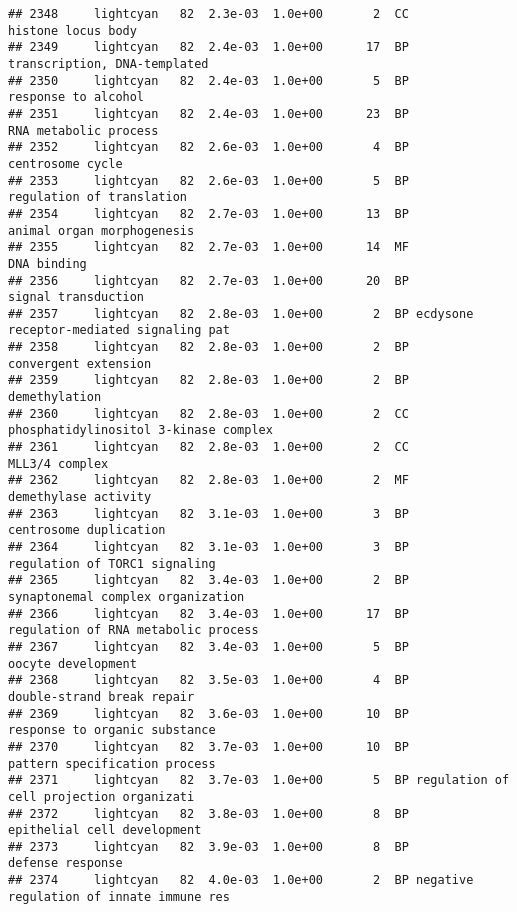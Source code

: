 \documentclass[]{article}
\begin{document}
\begin{verbatim}
## 2348     lightcyan   82  2.3e-03  1.0e+00       2  CC                       histone locus body
## 2349     lightcyan   82  2.4e-03  1.0e+00      17  BP             transcription, DNA-templated
## 2350     lightcyan   82  2.4e-03  1.0e+00       5  BP                      response to alcohol
## 2351     lightcyan   82  2.4e-03  1.0e+00      23  BP                    RNA metabolic process
## 2352     lightcyan   82  2.6e-03  1.0e+00       4  BP                         centrosome cycle
## 2353     lightcyan   82  2.6e-03  1.0e+00       5  BP                regulation of translation
## 2354     lightcyan   82  2.7e-03  1.0e+00      13  BP               animal organ morphogenesis
## 2355     lightcyan   82  2.7e-03  1.0e+00      14  MF                              DNA binding
## 2356     lightcyan   82  2.7e-03  1.0e+00      20  BP                      signal transduction
## 2357     lightcyan   82  2.8e-03  1.0e+00       2  BP ecdysone receptor-mediated signaling pat
## 2358     lightcyan   82  2.8e-03  1.0e+00       2  BP                     convergent extension
## 2359     lightcyan   82  2.8e-03  1.0e+00       2  BP                            demethylation
## 2360     lightcyan   82  2.8e-03  1.0e+00       2  CC    phosphatidylinositol 3-kinase complex
## 2361     lightcyan   82  2.8e-03  1.0e+00       2  CC                           MLL3/4 complex
## 2362     lightcyan   82  2.8e-03  1.0e+00       2  MF                     demethylase activity
## 2363     lightcyan   82  3.1e-03  1.0e+00       3  BP                   centrosome duplication
## 2364     lightcyan   82  3.1e-03  1.0e+00       3  BP            regulation of TORC1 signaling
## 2365     lightcyan   82  3.4e-03  1.0e+00       2  BP        synaptonemal complex organization
## 2366     lightcyan   82  3.4e-03  1.0e+00      17  BP      regulation of RNA metabolic process
## 2367     lightcyan   82  3.4e-03  1.0e+00       5  BP                       oocyte development
## 2368     lightcyan   82  3.5e-03  1.0e+00       4  BP               double-strand break repair
## 2369     lightcyan   82  3.6e-03  1.0e+00      10  BP            response to organic substance
## 2370     lightcyan   82  3.7e-03  1.0e+00      10  BP            pattern specification process
## 2371     lightcyan   82  3.7e-03  1.0e+00       5  BP regulation of cell projection organizati
## 2372     lightcyan   82  3.8e-03  1.0e+00       8  BP              epithelial cell development
## 2373     lightcyan   82  3.9e-03  1.0e+00       8  BP                         defense response
## 2374     lightcyan   82  4.0e-03  1.0e+00       2  BP negative regulation of innate immune res

\end{verbatim}
\end{document}
